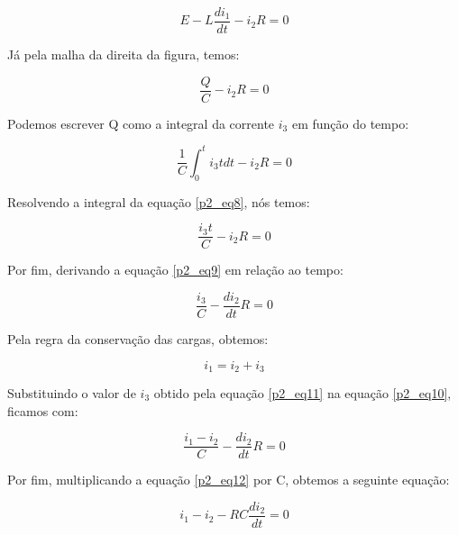 \documentclass[12pt]{article}%
\begin{document}
    \begin{equation}
        E - L\frac{di_{1}}{dt} - i_{2}R = 0
        \label{p2_eq6}
    \end{equation}
    
    Já pela malha da direita da figura, temos:
    
    \begin{equation}
        \frac{Q}{C} - i_{2}R = 0
        \label{p2_eq7}
    \end{equation}
    
    Podemos escrever Q como a integral da corrente \(i_{3}\) em função do tempo:
    
    \begin{equation}
        \frac{1}{C} \int_{0}^{t} i_{3}tdt - i_{2}R = 0
        \label{p2_eq8}
    \end{equation}
    
    Resolvendo a integral da equação \ref{p2_eq8}, nós temos:
    
    \begin{equation}
        \frac{i_{3}t}{C} - i_{2}R = 0
        \label{p2_eq9}
    \end{equation}
    
    Por fim, derivando a equação \ref{p2_eq9} em relação ao tempo:
    
    \begin{equation}
        \frac{i_{3}}{C} - \frac{di_{2}}{dt} R = 0
        \label{p2_eq10}
    \end{equation}
    
    Pela regra da conservação das cargas, obtemos:
    
    \begin{equation}
        i_{1} = i_{2} + i_{3}
        \label{p2_eq11}
    \end{equation}
    
    Substituindo o valor de \(i_{3}\) obtido pela equação \ref{p2_eq11} na equação \ref{p2_eq10}, ficamos com:
    
    \begin{equation}
        \frac{i_{1} - i_{2}}{C} - \frac{di_{2}}{dt}R = 0
        \label{p2_eq12}
    \end{equation}
    
    Por fim, multiplicando a equação \ref{p2_eq12} por C, obtemos a seguinte equação:
    
    \begin{equation}
        i_{1} - i_{2} - RC\frac{di_{2}}{dt} = 0
        \label{p2_eq13}
    \end{equation}
    
\end{document}
